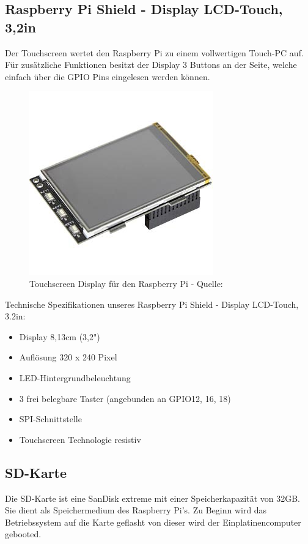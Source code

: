 \documentclass[a4paper,11pt,singlespacing]{article}
\begin{document}
			\subsection{Raspberry Pi Shield - Display LCD-Touch, 3,2in}
				Der Touchscreen wertet den Raspberry Pi zu einem vollwertigen Touch-PC auf. Für zusätzliche Funktionen besitzt der Display 3 Buttons an der Seite, welche einfach über die GPIO Pins eingelesen werden können.
				\begin{figure}[ht]
					\centering
					\includegraphics[scale=0.5]{touch_display}
					\caption{Touchscreen Display für den Raspberry Pi - Quelle: \cite{Picture_touchdisplay}}
					\label{touchdisplay}
				\end{figure}
				Technische Spezifikationen unseres Raspberry Pi Shield - Display LCD-Touch, 3.2in:
				\begin{itemize}
					\item Display 8,13cm (3,2")
					\item Auflösung 320 x 240 Pixel
					\item LED-Hintergrundbeleuchtung
					\item 3 frei belegbare Taster (angebunden an GPIO12, 16, 18)
					\item SPI-Schnittstelle
					\item Touchscreen Technologie resistiv
				\end{itemize}
			\subsection{SD-Karte}
    			Die SD-Karte ist eine SanDisk extreme mit einer Speicherkapazität von 32GB. Sie dient als Speichermedium des Raspberry Pi's. Zu Beginn wird das Betriebssystem auf die Karte geflasht von dieser wird der Einplatinencomputer gebooted.
\end{document}
